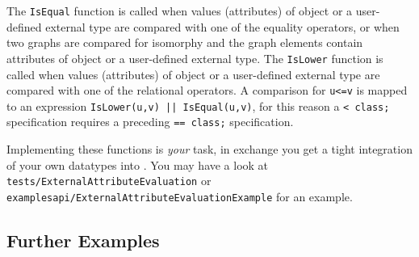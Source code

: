 The \texttt{IsEqual} function is called when values (attributes) of object or a user-defined external type are compared with one of the equality operators,
or when two graphs are compared for isomorphy and the graph elements contain attributes of object or a user-defined external type.
The \texttt{IsLower} function is called when values (attributes) of object or a user-defined external type are compared with one of the relational operators.
A comparison for \texttt{u<=v} is mapped to an expression \verb#IsLower(u,v) || IsEqual(u,v)#, for this reason a \verb#< class;# specification requires a preceding \verb#== class;# specification.

Implementing these functions is \emph{your} task, in exchange you get a tight integration of your own datatypes into \GrG.
You may have a look at \texttt{tests/External\-Attribute\-Evaluation} or \texttt{examples\-api/External\-Attribute\-Evaluation\-Example} for an example.

\subsection*{Further Examples}

